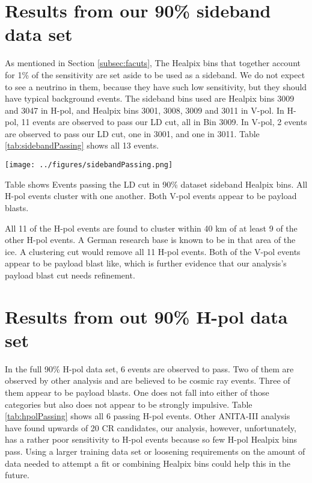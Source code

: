 \section{Results from our 90\% sideband data set}

As mentioned in Section \ref{subsec:facuts}, The Healpix bins that together account for 1\% of the sensitivity are set aside to be used as a sideband.  We do not expect to see a neutrino in them, because they have such low sensitivity, but they should have typical background events.  The sideband bins used are Healpix bins 3009 and 3047 in H-pol, and Healpix bins 3001, 3008, 3009 and 3011 in V-pol.  In H-pol, 11 events are observed to pass our LD cut, all in Bin 3009.  In V-pol, 2 events are observed to pass our LD cut, one in 3001, and one in 3011. Table \ref{tab:sidebandPassing} shows all 13 events.

\begin{table}[h]
\centering
\texttt{[image: ../figures/sidebandPassing.png]}
\caption[Events passing LD Cut in sideband Healpix Bins]{Table shows Events passing the LD cut in 90\% dataset sideband Healpix bins.  All H-pol events cluster with one another.  Both V-pol events appear to be payload blasts.}
\label{tab:sidebandPassing}
\end{table}

All 11 of the H-pol events are found to cluster within 40 km of at least 9 of the other H-pol events.  A German research base is known to be in that area of the ice.  A clustering cut would remove all 11 H-pol events.  Both of the V-pol events appear to be payload blast like, which is further evidence that our analysis's payload blast cut needs refinement.

\section{Results from out 90\% H-pol data set}

In the full 90\% H-pol data set, 6 events are observed to pass.  Two of them are observed by other analysis and are believed to be cosmic ray events.  Three of them appear to be payload blasts.  One does not fall into either of those categories but also does not appear to be strongly impulsive.  Table \ref{tab:hpolPassing} shows all 6 passing H-pol events.  Other ANITA-III analysis have found upwards of 20 CR candidates, our analysis, however, unfortunately, has a rather poor sensitivity to H-pol events because so few H-pol Healpix bins pass.  Using a larger training data set or loosening requirements on the amount of data needed to attempt a fit or combining Healpix bins could help this in the future.

